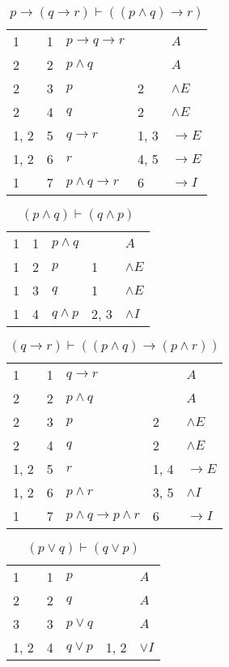 \documentclass{article}
\begin{document}
\begin{table}[htbp]
\end{table}\begin{table}[htbp]\caption*{$p → (q → r) ⊢ ((p ∧ q) → r)$}\centering\begin{tabular}{lrlll}
{1} & 1 & $p→q→r$ & {} & $A$ \\
{2} & 2 & $p∧q$ & {} & $A$ \\
{2} & 3 & $p$ & {2} & $∧E$ \\
{2} & 4 & $q$ & {2} & $∧E$ \\
{1, 2} & 5 & $q→r$ & {1, 3} & $→E$ \\
{1, 2} & 6 & $r$ & {4, 5} & $→E$ \\
{1} & 7 & $p∧q→r$ & {6} & $→I$ \\
\end{tabular}
\end{table}\begin{table}[htbp]\caption*{$(p ∧ q) ⊢ (q ∧ p)$}\centering\begin{tabular}{lrlll}
{1} & 1 & $p∧q$ & {} & $A$ \\
{1} & 2 & $p$ & {1} & $∧E$ \\
{1} & 3 & $q$ & {1} & $∧E$ \\
{1} & 4 & $q∧p$ & {2, 3} & $∧I$ \\
\end{tabular}
\end{table}\begin{table}[htbp]\caption*{$(q → r) ⊢ ((p ∧ q) → (p ∧ r))$}\centering\begin{tabular}{lrlll}
{1} & 1 & $q→r$ & {} & $A$ \\
{2} & 2 & $p∧q$ & {} & $A$ \\
{2} & 3 & $p$ & {2} & $∧E$ \\
{2} & 4 & $q$ & {2} & $∧E$ \\
{1, 2} & 5 & $r$ & {1, 4} & $→E$ \\
{1, 2} & 6 & $p∧r$ & {3, 5} & $∧I$ \\
{1} & 7 & $p∧q→p∧r$ & {6} & $→I$ \\
\end{tabular}
\end{table}\begin{table}[htbp]\caption*{$(p∨q) ⊢ (q∨p)$}\centering\begin{tabular}{lrlll}
{1} & 1 & $p$ & {} & $A$ \\
{2} & 2 & $q$ & {} & $A$ \\
{3} & 3 & $p∨q$ & {} & $A$ \\
{1, 2} & 4 & $q∨p$ & {1, 2} & $∨I$ \\

\end{tabular}
\end{table}
\end{document}

